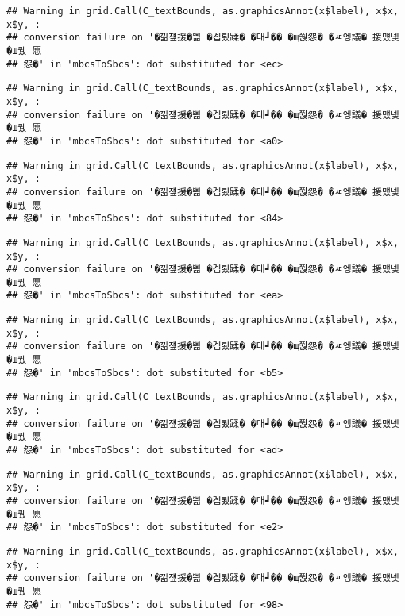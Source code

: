 \documentclass[
]{article}
\begin{document}
\begin{verbatim}
## Warning in grid.Call(C_textBounds, as.graphicsAnnot(x$label), x$x, x$y, :
## conversion failure on '�낆쟾援�쁾 �곕룄蹂� �대┛�� �щ쭩怨� �ㅼ엥議� 援먰넻�ш퀬 愿
## 怨�' in 'mbcsToSbcs': dot substituted for <ec>
\end{verbatim}

\begin{verbatim}
## Warning in grid.Call(C_textBounds, as.graphicsAnnot(x$label), x$x, x$y, :
## conversion failure on '�낆쟾援�쁾 �곕룄蹂� �대┛�� �щ쭩怨� �ㅼ엥議� 援먰넻�ш퀬 愿
## 怨�' in 'mbcsToSbcs': dot substituted for <a0>
\end{verbatim}

\begin{verbatim}
## Warning in grid.Call(C_textBounds, as.graphicsAnnot(x$label), x$x, x$y, :
## conversion failure on '�낆쟾援�쁾 �곕룄蹂� �대┛�� �щ쭩怨� �ㅼ엥議� 援먰넻�ш퀬 愿
## 怨�' in 'mbcsToSbcs': dot substituted for <84>
\end{verbatim}

\begin{verbatim}
## Warning in grid.Call(C_textBounds, as.graphicsAnnot(x$label), x$x, x$y, :
## conversion failure on '�낆쟾援�쁾 �곕룄蹂� �대┛�� �щ쭩怨� �ㅼ엥議� 援먰넻�ш퀬 愿
## 怨�' in 'mbcsToSbcs': dot substituted for <ea>
\end{verbatim}

\begin{verbatim}
## Warning in grid.Call(C_textBounds, as.graphicsAnnot(x$label), x$x, x$y, :
## conversion failure on '�낆쟾援�쁾 �곕룄蹂� �대┛�� �щ쭩怨� �ㅼ엥議� 援먰넻�ш퀬 愿
## 怨�' in 'mbcsToSbcs': dot substituted for <b5>
\end{verbatim}

\begin{verbatim}
## Warning in grid.Call(C_textBounds, as.graphicsAnnot(x$label), x$x, x$y, :
## conversion failure on '�낆쟾援�쁾 �곕룄蹂� �대┛�� �щ쭩怨� �ㅼ엥議� 援먰넻�ш퀬 愿
## 怨�' in 'mbcsToSbcs': dot substituted for <ad>
\end{verbatim}

\begin{verbatim}
## Warning in grid.Call(C_textBounds, as.graphicsAnnot(x$label), x$x, x$y, :
## conversion failure on '�낆쟾援�쁾 �곕룄蹂� �대┛�� �щ쭩怨� �ㅼ엥議� 援먰넻�ш퀬 愿
## 怨�' in 'mbcsToSbcs': dot substituted for <e2>
\end{verbatim}

\begin{verbatim}
## Warning in grid.Call(C_textBounds, as.graphicsAnnot(x$label), x$x, x$y, :
## conversion failure on '�낆쟾援�쁾 �곕룄蹂� �대┛�� �щ쭩怨� �ㅼ엥議� 援먰넻�ш퀬 愿
## 怨�' in 'mbcsToSbcs': dot substituted for <98>
\end{verbatim}
\end{document}
